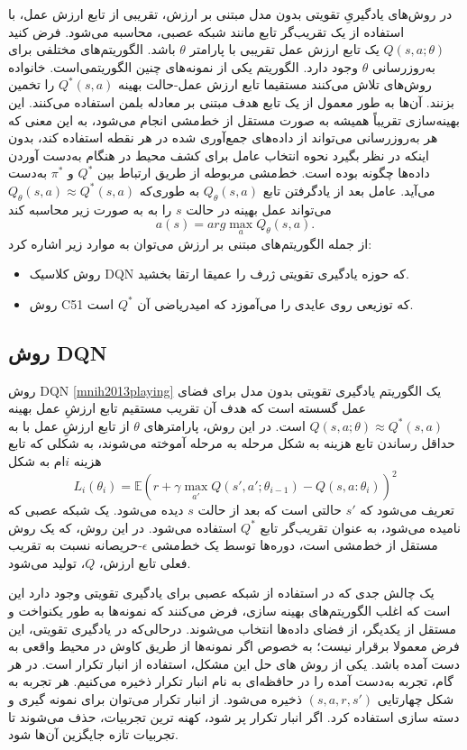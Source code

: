 در روش‌های یادگیریِ تقویتی بدون مدل مبتنی بر ارزش،
تقریبی از تابع ارزش عمل، با استفاده از  یک تقریب‌گر تابع
 مانند شبکه عصبی، محاسبه می‌شود. فرض کنید
$Q(s,a;\theta)$
یک تابع ارزش عمل تقریبی با پارامتر  
$\theta$ 
باشد.
الگوریتم‌های مختلفی برای به‌روزرسانی $\theta$ وجود دارد.
الگوریتم 
  یکی از نمونه‌های چنین الگوریتمی‌است.
  خانواده روش‌های 
    تلاش می‌کنند مستقیما تابع ارزش عمل-حالت بهینه $Q^*(s,a)$ را تخمین بزنند. آن‌ها به طور معمول از یک تابع هدف مبتنی بر معادله بلمن استفاده می‌کنند. این بهینه‌سازی تقریباً همیشه به صورت مستقل از خط‌مشی انجام می‌شود، به این معنی که هر به‌روزرسانی می‌تواند از داده‌های جمع‌آوری شده در هر نقطه استفاده کند، بدون اینکه در نظر بگیرد نحوه انتخاب عامل برای کشف محیط در هنگام به‌دست آوردن داده‌ها چگونه بوده است. خط‌مشی مربوطه از طریق ارتباط بین 
  $Q^*$
  و
  $\pi^*$
  به‌دست می‌آید. 
  عامل بعد از یادگرفتن تابع $Q_\theta(s,a)$ به طوری‌که  $Q_\theta(s,a) \approx Q^*(s,a)$ می‌تواند عمل بهینه در حالت $s$ را به به صورت زیر محاسبه کند $$a(s) = arg \max_a Q_{\theta}(s,a).$$
  از جمله الگوریتم‌های مبتنی بر ارزش می‌توان به موارد زیر اشاره کرد:
  \begin{itemize}
  	\item روش کلاسیک DQN که حوزه یادگیری تقویتی ژرف را عمیقا ارتقا بخشید.
  	\item روش C51 که توزیعی روی عایدی را می‌آموزد که امیدریاضی آن $Q^*$ است.
  \end{itemize}

\subsection{روش DQN}
روش DQN 
\ref{mnih2013playing}
 یک الگوریتم یادگیری تقویتی بدون مدل برای فضای عمل گسسته است که هدف آن تقریب مستقیم تابع ارزشِ عمل بهینه 
 $Q(s,a; \theta) \approx  Q^*(s,a)$
 است. در این روش، پارامترهای $\theta$ از تابع ارزشِ عمل با به حداقل رساندن تابع هزینه به شکل مرحله به مرحله آموخته می‌شوند، به شکلی که تابع هزینه $i$ام به شکل 
 $$L_i(\theta_i) = \mathbb{E} {\left( r+\gamma \max_{a'} Q(s',a'; \theta_{i-1})- Q(s,a:\theta_i) \right)}^2$$
 تعریف می‌شود که 
$s'$
 حالتی است که بعد از حالت $s$ دیده می‌شود. یک شبکه عصبی که 
\textit{}
  نامیده می‌شود، به عنوان تقریب‌گر تابع $Q^*$ استفاده می‌شود.
در این روش، که یک روش مستقل از خط‌مشی است، دوره‌ها توسط یک خط‌مشی 
$\epsilon$-حریصانه
نسبت به تقریب فعلی تابع ارزش، $Q$، تولید می‌شود. 

یک چالش جدی که در استفاده از شبکه عصبی برای یادگیری تقویتی وجود دارد این است که اغلب الگوریتم‌های بهینه سازی، فرض می‌کنند که نمونه‌ها به طور یکنواخت و مستقل از یکدیگر، از فضای داده‌ها انتخاب می‌شوند. درحالی‌که در یادگیری تقویتی، این فرض معمولا برقرار نیست؛ به خصوص اگر نمونه‌ها از طریق کاوش در محیط واقعی به دست آمده باشد. یکی از روش های  حل این مشکل، استفاده از انبار تکرار است. در هر گام، تجربه به‌دست آمده را در حافظه‌ای به نام انبار تکرار ذخیره می‌کنیم. هر تجربه به شکل چهارتایی 
$(s,a,r,s')$
ذخیره می‌شود. از انبار تکرار می‌توان برای نمونه گیری و دسته  سازی استفاده کرد. اگر انبار تکرار پر شود، کهنه ترین تجربیات، حذف می‌شوند تا تجربیات تازه جایگزین آن‌ها شود.

